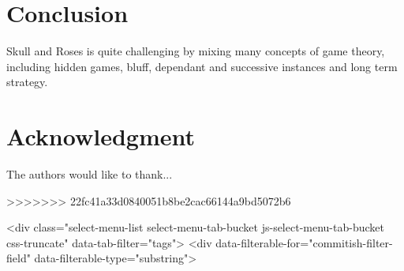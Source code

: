 \section{Conclusion}
Skull and Roses is quite challenging by mixing many concepts of game theory, including hidden games, bluff, dependant and successive instances and long term strategy.






\section*{Acknowledgment}


The authors would like to thank...







%
%
%





>>>>>>> 22fc41a33d0840051b8be2cac66144a9bd5072b6

          <div class="select-menu-list select-menu-tab-bucket js-select-menu-tab-bucket css-truncate" data-tab-filter="tags">
            <div data-filterable-for="commitish-filter-field" data-filterable-type="substring">

